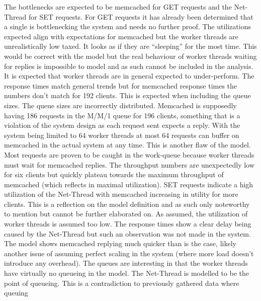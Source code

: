                 The bottlenecks are expected to be memcached for GET requests and the Net-Thread for SET requests. For
                GET requests it has already been determined that a single \srv{} is bottlenecking the system and needs
                no further proof. The utilizations expected align with expectations for memcached but the worker threads
                are unrealistically low taxed. It looks as if they are ``sleeping'' for the most time. This would be
                correct with the model but the real behaviour of worker threads waiting for replies is impossible to
                model and as such cannot be included in the analysis. It is expected that worker threads are in general
                expected to under-perform. The response times match general trends but for memcached response times the
                numbers don't match for 192 clients. This is expected when including the queue sizes. The queue sizes
                are incorrectly distributed. Memcached is supposedly having 186 requests in the M/M/1 queue for 196
                clients, something that is a violation of the system design as each request sent expects a reply. With
                the system being limited to 64 worker threads at most 64 requests can buffer on memcached in the actual
                system at any time. This is another flaw of the model. Most requests are proven to be caught in the
                work-queue because worker threads must wait for memcached replies. The throughput numbers are
                unexpectedly low for six clients but quickly plateau towards the maximum throughput of memcached (which
                reflects in maximal utilization).\newline
                SET requests indicate a high utilization of the Net-Thread with memcached increasing in utility for more
                clients. This is a reflection on the model definition and as such only noteworthy to mention but cannot
                be further elaborated on. As assumed, the utilization of worker threads is assumed too low. The response
                times show a clear delay being caused by the Net-Thread but such an observation was not made in the
                system. The model shows memcached replying much quicker than is the case, likely another issue of
                assuming perfect scaling in the system (where more load doesn't introduce any overhead). The queues are
                interesting in that the worker threads have virtually no queueing in the model. The Net-Thread is
                modelled to be the point of queueing. This is a contradiction to previously gathered data where queuing

